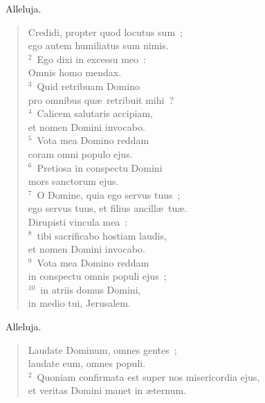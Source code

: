 ~\lettrine[lines=10,image=true,loversize=0.05,lraise=-0.03]{A}{}lleluja. \begin{flushleft}\begin{verse}\vspace{6pt}Credidi, propter quod locutus sum~;\\ ego autem humiliatus sum nimis.\\
${}^{2}$~Ego dixi in excessu meo~:\\ Omnis homo mendax.\\
${}^{3}$~Quid retribuam Domino\\ pro omnibus qu\ae\ retribuit mihi~?\\
${}^{4}$~Calicem salutaris accipiam,\\ et nomen Domini invocabo.\\
${}^{5}$~Vota mea Domino reddam\\ coram omni populo ejus.\\
${}^{6}$~Pretiosa in conspectu Domini\\ mors sanctorum ejus.\\
${}^{7}$~O Domine, quia ego servus tuus~;\\ ego servus tuus, et filius ancill\ae\ tu\ae .\\ Dirupisti vincula mea~:\\
${}^{8}$~tibi sacrificabo hostiam laudis,\\ et nomen Domini invocabo.\\
${}^{9}$~Vota mea Domino reddam\\ in conspectu omnis populi ejus~;\\
${}^{10}$~in atriis domus Domini,\\ in medio tui, Jerusalem.\end{verse}\end{flushleft}


~\lettrine[lines=10,image=true,loversize=0.05,lraise=-0.03]{A}{}lleluja. \begin{flushleft}\begin{verse}\vspace{6pt}Laudate Dominum, omnes gentes~;\\ laudate eum, omnes populi.\\
${}^{2}$~Quoniam confirmata est super nos misericordia ejus,\\ et veritas Domini manet in \ae ternum.\end{verse}\end{flushleft}


